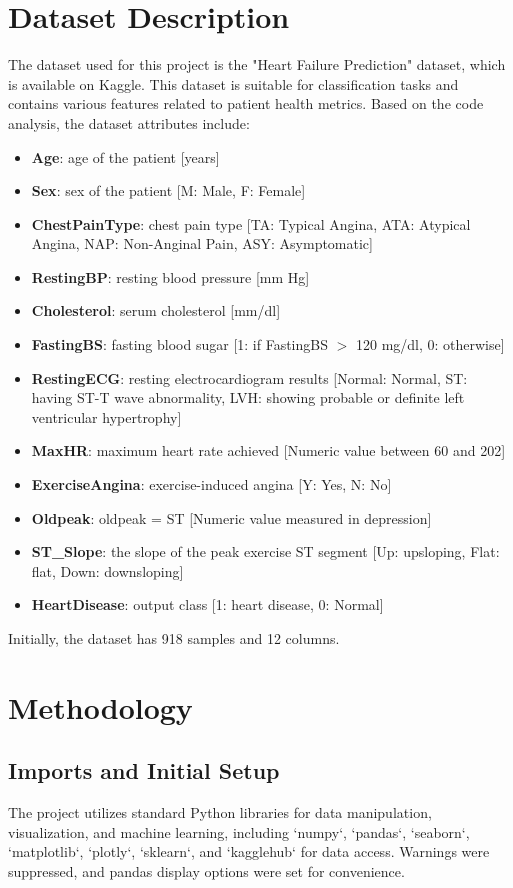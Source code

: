 \documentclass{article}
\begin{document}
\section{Dataset Description}
The dataset used for this project is the "Heart Failure Prediction" dataset, which is available on Kaggle. This dataset is suitable for classification tasks and contains various features related to patient health metrics.
Based on the code analysis, the dataset attributes include:
\begin{itemize}
    \item \textbf{Age}: age of the patient [years]
    \item \textbf{Sex}: sex of the patient [M: Male, F: Female]
    \item \textbf{ChestPainType}: chest pain type [TA: Typical Angina, ATA: Atypical Angina, NAP: Non-Anginal Pain, ASY: Asymptomatic]
    \item \textbf{RestingBP}: resting blood pressure [mm Hg]
    \item \textbf{Cholesterol}: serum cholesterol [mm/dl]
    \item \textbf{FastingBS}: fasting blood sugar [1: if FastingBS $>$ 120 mg/dl, 0: otherwise]
    \item \textbf{RestingECG}: resting electrocardiogram results [Normal: Normal, ST: having ST-T wave abnormality, LVH: showing probable or definite left ventricular hypertrophy]
    \item \textbf{MaxHR}: maximum heart rate achieved [Numeric value between 60 and 202]
    \item \textbf{ExerciseAngina}: exercise-induced angina [Y: Yes, N: No]
    \item \textbf{Oldpeak}: oldpeak = ST [Numeric value measured in depression]
    \item \textbf{ST\_Slope}: the slope of the peak exercise ST segment [Up: upsloping, Flat: flat, Down: downsloping]
    \item \textbf{HeartDisease}: output class [1: heart disease, 0: Normal]
\end{itemize}
Initially, the dataset has 918 samples and 12 columns.

\section{Methodology}

\subsection{Imports and Initial Setup}
The project utilizes standard Python libraries for data manipulation, visualization, and machine learning, including `numpy`, `pandas`, `seaborn`, `matplotlib`, `plotly`, `sklearn`, and `kagglehub` for data access. Warnings were suppressed, and pandas display options were set for convenience.
\end{document}
